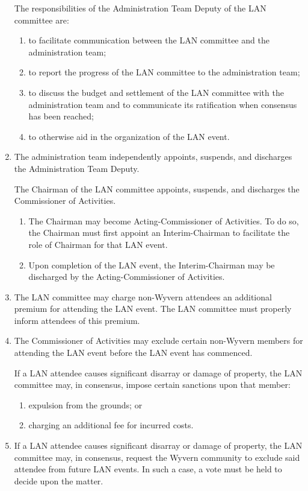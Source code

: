 \begin{enumerate}
    \begin{item}
        The responsibilities of the Administration Team Deputy of the LAN committee are:
        \begin{enumerate}
            \item to facilitate communication between the LAN committee and the administration team;
            \item to report the progress of the LAN committee to the administration team;
            \item to discuss the budget and settlement of the LAN committee with the administration team and to communicate its ratification when consensus has been reached;
            \item to otherwise aid in the organization of the LAN event.
        \end{enumerate}
    \end{item}

    \item The administration team independently appoints, suspends, and discharges the Administration Team Deputy.

    \begin{item}
        The Chairman of the LAN committee appoints, suspends, and discharges the Commissioner of Activities.
        \begin{enumerate}
            \item The Chairman may become Acting-Commissioner of Activities. To do so, the Chairman must first appoint an Interim-Chairman to facilitate the role of Chairman for that LAN event.
            \item Upon completion of the LAN event, the Interim-Chairman may be discharged by the Acting-Commissioner of Activities.
        \end{enumerate}
    \end{item}

    \item The LAN committee may charge non-Wyvern attendees an additional premium for attending the LAN event. The LAN committee must properly inform attendees of this premium.
    
    \item The Commissioner of Activities may exclude certain non-Wyvern members for attending the LAN event before the LAN event has commenced.
    
    \begin{item} If a LAN attendee causes significant disarray or damage of property, the LAN committee may, in consensus, impose certain sanctions upon that member:
        \begin{enumerate}
            \item expulsion from the grounds; or
            \item charging an additional fee for incurred costs.
        \end{enumerate}
    \end{item}
    
    \item If a LAN attendee causes significant disarray or damage of property, the LAN committee may, in consensus, request the Wyvern community to exclude said attendee from future LAN events. In such a case, a vote must be held to decide upon the matter.

\end{enumerate}
